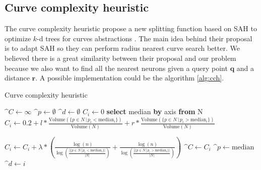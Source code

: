 \subsection{Curve complexity heuristic}
The curve complexity heuristic propose a new splitting function based on SAH to optimize $k$-d trees for curves abstractions \cite{Yucheng}. The main idea behind their proposal is to adapt SAH so they can perform radius nearest curve search better. We believed there is a great similarity between their proposal and our problem because we also want to find all the nearest neurons given a query point $\mathbf{q}$ and a distance $\mathbf{r}$. A possible implementation could be the algorithm \ref{alg:cch}.
\begin{algorithm}[h!]
    \caption{Curve complexity heuristic
        \label{alg:cch}}
    \begin{algorithmic}[1]
    \Statex
        \State $\^{C} \gets \infty$
        \State $\^{p} \gets \emptyset$
        \State $\^{d} \gets \emptyset$
            \State $C_i \gets 0$ 
            \State \textbf{select} median \textbf{by} axis \textbf{from} N
            \Statex
            \State $C_i \gets 0.2 + l*\frac{\text{Volume}(\{p \in N\, |\, p_i < \text{median}_i\})}{\text{Volume}(N)} + r*\frac{\text{Volume}(\{p \in N\, |\, p_i > \text{median}_i\})}{\text{Volume}(N)}$  
            
            \State $C_i \gets C_i + \lambda*(\frac{\log{}(n)}{\log{}(\frac{|\{p \in N\, |\, p_i < \text{median}_i\}|}{|N|})} + \frac{\log{}(n)}{\log{}(\frac{|\{p \in N\, |\, p_i > \text{median}_i\}|}{|N|})})$
                \State $\^{C} \gets C_i$
                \State $\^{p} \gets \text{median}$
                \State $\^{d} \gets i$
            \EndIf
        \EndFor
        \State {}
    \EndFunction
    \end{algorithmic}
\end{algorithm}

